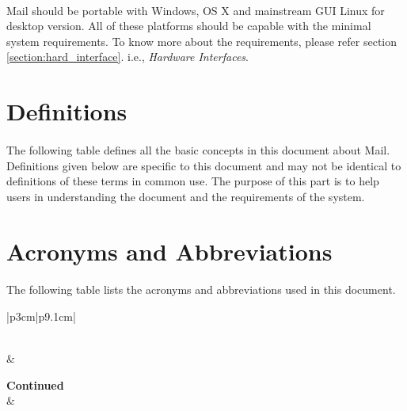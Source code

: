 \documentclass[11pt,a4paper]{article}
\begin{document}
            	\paragraph{} Mail should be portable with Windows, OS X and mainstream GUI Linux for desktop version. All of these platforms should be capable with the minimal system requirements. To know more about the requirements, please refer section \ref{section:hard_interface}. i.e., \emph{Hardware Interfaces}.
	\clearpage
    \appendix
    \begin{subappendices}
    	\section{Definitions}\label{appendix:definitions}
			\paragraph{} The following table defines all the basic concepts in this document about Mail. Definitions given below are specific to this document and may not be identical to definitions of these terms in common use. The purpose of this part is to help users in understanding the document and the requirements of the system.
		\clearpage
		\section{Acronyms and Abbreviations}\label{appendix:aaa}
			\paragraph{} The following table lists the acronyms and abbreviations used in this document.
            \begin{center}
                \begin{longtable}{|p{3cm}|p{9.1cm}|}
                    \caption[Definitions]{Acronyms \& Abbreviations} \label{grid:abbv} \\
                    \hline
                     & \\
                    \hline
                    \endfirsthead

                    {\textbf{Continued}} \\
                    \hline
                     &  \\
                    \hline
                    \endhead


\end{longtable}
\end{center}
\end{subappendices}
\end{document}
